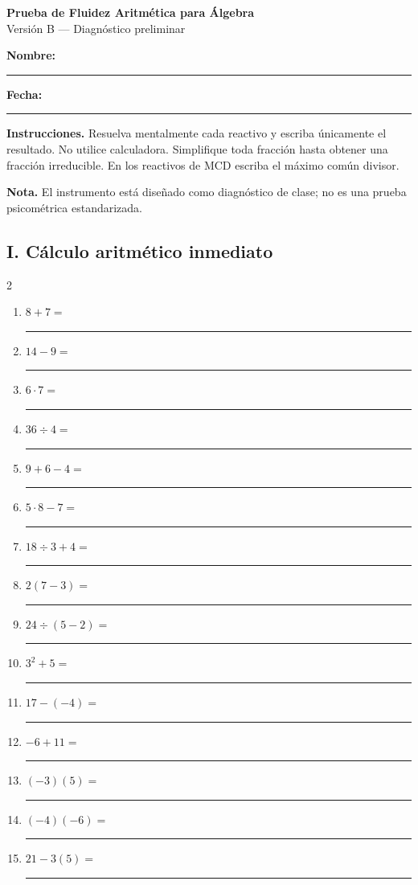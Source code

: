 \documentclass[11pt]{article}
\begin{document}
\begin{center}
{\Large\bfseries Prueba de Fluidez Aritmética para Álgebra}\\[1mm]
{\large Versión B --- Diagnóstico preliminar}
\end{center}

\textbf{Nombre:} \rule{9cm}{0.4pt}\hfill
\textbf{Fecha:} \rule{3cm}{0.4pt}

\medskip
\textbf{Instrucciones.} Resuelva mentalmente cada reactivo y escriba únicamente
el resultado. No utilice calculadora. Simplifique toda fracción hasta obtener
una fracción irreducible. En los reactivos de MCD escriba el máximo común divisor.

\medskip
\textbf{Nota.} El instrumento está diseñado como diagnóstico de clase; no es
una prueba psicométrica estandarizada.

\subsection*{I. Cálculo aritmético inmediato}
\begin{multicols}{2}\begin{enumerate}[leftmargin=*,start=1]
\item $\displaystyle 8+7=$ \rule{2.0cm}{0.4pt}
\item $\displaystyle 14-9=$ \rule{2.0cm}{0.4pt}
\item $\displaystyle 6\cdot7=$ \rule{2.0cm}{0.4pt}
\item $\displaystyle 36\div4=$ \rule{2.0cm}{0.4pt}
\item $\displaystyle 9+6-4=$ \rule{2.0cm}{0.4pt}
\item $\displaystyle 5\cdot8-7=$ \rule{2.0cm}{0.4pt}
\item $\displaystyle 18\div3+4=$ \rule{2.0cm}{0.4pt}
\item $\displaystyle 2(7-3)=$ \rule{2.0cm}{0.4pt}
\item $\displaystyle 24\div(5-2)=$ \rule{2.0cm}{0.4pt}
\item $\displaystyle 3^2+5=$ \rule{2.0cm}{0.4pt}
\item $\displaystyle 17-(-4)=$ \rule{2.0cm}{0.4pt}
\item $\displaystyle -6+11=$ \rule{2.0cm}{0.4pt}
\item $\displaystyle (-3)(5)=$ \rule{2.0cm}{0.4pt}
\item $\displaystyle (-4)(-6)=$ \rule{2.0cm}{0.4pt}
\item $\displaystyle 21-3(5)=$ \rule{2.0cm}{0.4pt}
\end{enumerate}\end{multicols}
\end{document}
